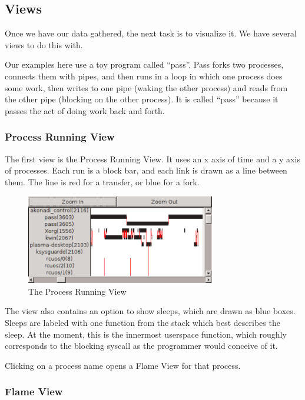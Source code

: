 \documentclass{article}
\begin{document}
\subsection{Views}

Once we have our data gathered, the next task is to visualize it.  We have several views to do this with.

Our examples here use a toy program called ``pass''.  Pass forks two processes, connects them with pipes, and then runs in a loop in which one process does some work, then writes to one pipe (waking the other process) and reads from the other pipe (blocking on the other process).  It is called ``pass'' because it passes the act of doing work back and forth.

\subsubsection{Process Running View}

The first view is the Process Running View.  It uses an x axis of time and a y axis of processes.  Each run is a block bar, and each link is drawn as a line between them.  The line is red for a transfer, or blue for a fork.

\begin{figure}[h]
\includegraphics[width=3.25in]{screenshot}
\caption{The Process Running View}
\end{figure}

The view also contains an option to show sleeps, which are drawn as blue boxes.  Sleeps are labeled with one function from the stack which best describes the sleep.  At the moment, this is the innermost userspace function, which roughly corresponds to the blocking syscall as the programmer would conceive of it.

Clicking on a process name opens a Flame View for that process.

\subsubsection{Flame View}
\end{document}
